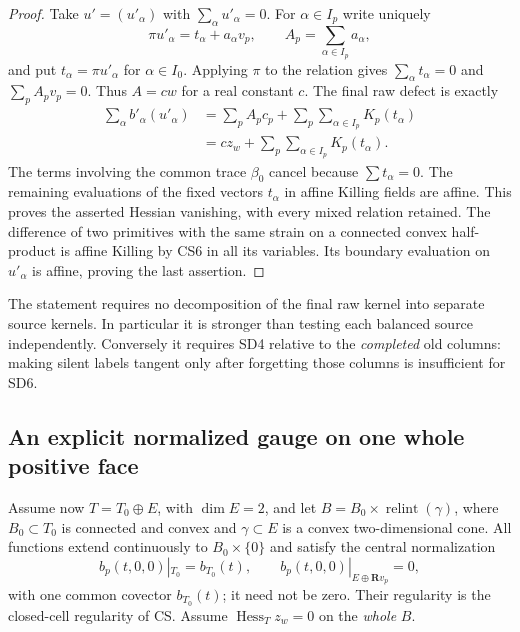 \begin{proof}
Take $u'=(u'_\alpha)$ with $\sum_\alpha u'_\alpha=0$.
For $\alpha\in I_p$ write uniquely
\[
 \pi u'_\alpha=t_\alpha+a_\alpha v_p,
 \qquad A_p=\sum_{\alpha\in I_p}a_\alpha,
 \tag{SD6}
\]
and put $t_\alpha=\pi u'_\alpha$ for $\alpha\in I_0$.
Applying $\pi$ to the relation gives
$\sum_\alpha t_\alpha=0$ and $\sum_pA_pv_p=0$.
Thus $A=cw$ for a real constant $c$.  The final raw defect is
exactly
\[
 \begin{split}
 \sum_\alpha b'_\alpha(u'_\alpha)
   &=\sum_pA_pc_p+
       \sum_p\sum_{\alpha\in I_p}K_p(t_\alpha)\\
   &=c z_w+
       \sum_p\sum_{\alpha\in I_p}K_p(t_\alpha).
 \end{split}
 \tag{SD7}
\]
The terms involving the common trace $\beta_0$ cancel because
$\sum t_\alpha=0$.  The remaining evaluations of the fixed
vectors $t_\alpha$ in affine Killing fields are affine.  This
proves the asserted Hessian vanishing, with every mixed relation
retained.  The difference of two primitives with the same strain
on a connected convex half-product is affine Killing by CS6 in
all its variables.  Its boundary evaluation on $u'_\alpha$ is
affine, proving the last assertion.
\end{proof}

The statement requires no decomposition of the final raw kernel
into separate source kernels.  In particular it is stronger than
testing each balanced source independently.  Conversely it
requires SD4 relative to the \emph{completed} old columns: making
silent labels tangent only after forgetting those columns is
insufficient for SD6.

\subsection{An explicit normalized gauge on one whole positive face}

Assume now $T=T_0\oplus E$, with $\dim E=2$, and let
$B=B_0\times\operatorname{relint}(\gamma)$, where $B_0\subset T_0$
is connected and convex and $\gamma\subset E$ is a convex
two-dimensional cone.  All functions extend continuously to
$B_0\times\{0\}$ and satisfy the central normalization
\[
        b_p(t,0,0)|_{T_0}=b_{T_0}(t),\qquad
        b_p(t,0,0)|_{E\oplus\mathbf Rv_p}=0,
 \tag{LG1}
\]
with one common covector $b_{T_0}(t)$; it need not be zero.
Their regularity is the closed-cell regularity of CS.  Assume
$\operatorname{Hess}_Tz_w=0$ on the \emph{whole} $B$.


